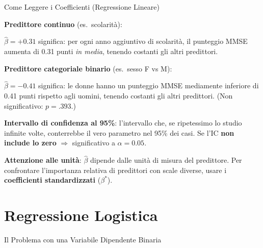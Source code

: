 \documentclass[
  ignorenonframetext,
]{beamer}
\begin{document}
\begin{frame}{Come Leggere i Coefficienti (Regressione Lineare)}
\label{come-leggere-i-coefficienti-regressione-lineare}
\small

\textbf{Predittore continuo} (es.~scolarità):

\(\hat{\beta} = +0.31\) significa: per ogni anno aggiuntivo di
scolarità, il punteggio MMSE aumenta di 0.31 punti \emph{in media},
tenendo costanti gli altri predittori.

\vspace{0.4em}

\textbf{Predittore categoriale binario} (es.~sesso F vs M):

\(\hat{\beta} = -0.41\) significa: le donne hanno un punteggio MMSE
mediamente inferiore di 0.41 punti rispetto agli uomini, tenendo
costanti gli altri predittori. (Non significativo: \(p = .393\).)

\vspace{0.4em}

\textbf{Intervallo di confidenza al 95\%}: l'intervallo che, se
ripetessimo lo studio infinite volte, conterrebbe il vero parametro nel
95\% dei casi. Se l'IC \textbf{non include lo zero} \(\Rightarrow\)
significativo a \(\alpha = 0.05\).

\vspace{0.4em}

\textbf{Attenzione alle unità}: \(\hat{\beta}\) dipende dalle unità di
misura del predittore. Per confrontare l'importanza relativa di
predittori con scale diverse, usare i
\textbf{coefficienti standardizzati} (\(\beta^*\)).
\end{frame}

\section{Regressione Logistica}\label{regressione-logistica}

\begin{frame}{Il Problema con una Variabile Dipendente Binaria}
\label{il-problema-con-una-variabile-dipendente-binaria}
\end{frame}
\end{document}
